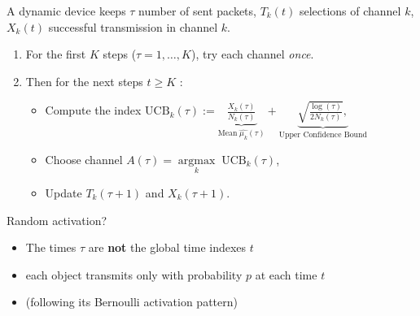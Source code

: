 \begin{frameO}

    A dynamic device keeps \(\tau\) number of sent packets, \(T_k(t)\)
    selections of channel \(k\), \(X_k(t)\) successful transmission in
    channel \(k\).

    \begin{enumerate}
        \def\labelenumi{\arabic{enumi}.}
        \tightlist
        \item
              For the first \(K\) steps (\(\tau=1,\dots,K\)), try each channel
              \emph{once}.
        \item
              Then for the next steps \(t \geq K\) :

              \begin{itemize}
                  \tightlist
                  \item
                        Compute the index
                        \(\mathrm{UCB}_k(\tau) := \underbrace{\frac{X_k(\tau)}{N_k(\tau)}}_{\text{Mean}\; \widehat{\mu_k}(\tau)} + \underbrace{\sqrt{\frac{\log(\tau)}{2 N_k(\tau)}},}_{\text{Upper Confidence Bound}}\)
                  \item
                        Choose channel
                        \(A(\tau) = \mathop{\arg\max}\limits_{k} \; \mathrm{UCB}_k(\tau)\),
                  \item
                        Update \(T_k(\tau+1)\) and \(X_k(\tau+1)\).
              \end{itemize}
    \end{enumerate}

    \begin{colorblock}{Random activation?}
        \begin{itemize}
            \item
            The times $\tau$ are \textbf{not} the global time indexes $t$
            \item
            each object transmits only with probability $p$ at each time $t$
            \item
            (following its Bernoulli activation pattern)
        \end{itemize}
    \end{colorblock}


\end{frameO}



